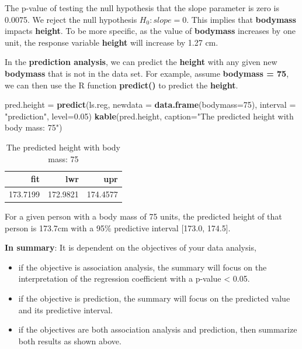 \documentclass[
]{book}
\newenvironment{Shaded}{\begin{snugshade}}{\end{snugshade}}
\newcommand{\AttributeTok}[1]{\textcolor[rgb]{0.13,0.29,0.53}{#1}}
\newcommand{\DecValTok}[1]{\textcolor[rgb]{0.00,0.00,0.81}{#1}}
\newcommand{\FloatTok}[1]{\textcolor[rgb]{0.00,0.00,0.81}{#1}}
\newcommand{\FunctionTok}[1]{\textcolor[rgb]{0.13,0.29,0.53}{\textbf{#1}}}
\newcommand{\NormalTok}[1]{#1}
\newcommand{\OtherTok}[1]{\textcolor[rgb]{0.56,0.35,0.01}{#1}}
\newcommand{\StringTok}[1]{\textcolor[rgb]{0.31,0.60,0.02}{#1}}
\begin{document}
The p-value of testing the null hypothesis that the slope parameter is zero is 0.0075. We reject the null hypothesis \(H_0: slope = 0\). This implies that \textbf{bodymass} impacts \textbf{height}. To be more specific, as the value of \textbf{bodymass} increases by one unit, the response variable \textbf{height} will increase by 1.27 cm.

In the \textbf{prediction analysis}, we can predict the \textbf{height} with any given new \textbf{bodymass} that is not in the data set. For example, assume \textbf{bodymass = 75}, we can then use the R function \textbf{predict()} to predict the \textbf{height}.

\begin{Shaded}
\begin{Highlighting}[]
\NormalTok{pred.height }\OtherTok{=} \FunctionTok{predict}\NormalTok{(ls.reg, }\AttributeTok{newdata =} \FunctionTok{data.frame}\NormalTok{(}\AttributeTok{bodymass=}\DecValTok{75}\NormalTok{), }
                      \AttributeTok{interval =} \StringTok{"prediction"}\NormalTok{, }\AttributeTok{level=}\FloatTok{0.05}\NormalTok{)}
\FunctionTok{kable}\NormalTok{(pred.height, }\AttributeTok{caption=}\StringTok{"The predicted height with body mass: 75"}\NormalTok{)}
\end{Highlighting}
\end{Shaded}

\begin{table}

\caption{\label{tab:unnamed-chunk-145}The predicted height with body mass: 75}
\centering
\begin{tabular}[t]{r|r|r}
\hline
fit & lwr & upr\\
\hline
173.7199 & 172.9821 & 174.4577\\
\hline
\end{tabular}
\end{table}

For a given person with a body mass of 75 units, the predicted height of that person is 173.7cm with a 95\% predictive interval {[}173.0, 174.5{]}.

\textbf{In summary}: It is dependent on the objectives of your data analysis,

\begin{itemize}
\item
  if the objective is association analysis, the summary will focus on the interpretation of the regression coefficient with a p-value \textless{} 0.05.
\item
  if the objective is prediction, the summary will focus on the predicted value and its predictive interval.
\item
  if the objectives are both association analysis and prediction, then summarize both results as shown above.
\end{itemize}
\end{document}
